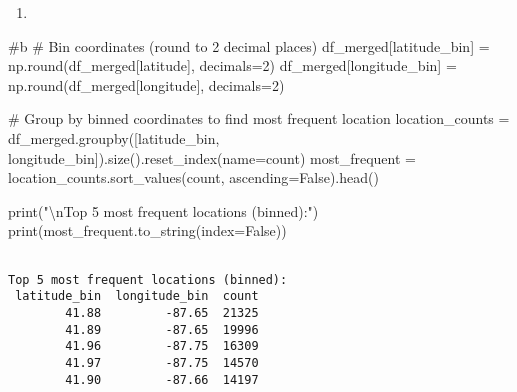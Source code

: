 \documentclass[
  letterpaper,
  DIV=11,
  numbers=noendperiod]{scrartcl}
\newenvironment{Shaded}{\begin{snugshade}}{\end{snugshade}}
\newcommand{\BuiltInTok}[1]{\textcolor[rgb]{0.00,0.23,0.31}{#1}}
\newcommand{\CharTok}[1]{\textcolor[rgb]{0.13,0.47,0.30}{#1}}
\newcommand{\CommentTok}[1]{\textcolor[rgb]{0.37,0.37,0.37}{#1}}
\newcommand{\DecValTok}[1]{\textcolor[rgb]{0.68,0.00,0.00}{#1}}
\newcommand{\NormalTok}[1]{\textcolor[rgb]{0.00,0.23,0.31}{#1}}
\newcommand{\OperatorTok}[1]{\textcolor[rgb]{0.37,0.37,0.37}{#1}}
\newcommand{\StringTok}[1]{\textcolor[rgb]{0.13,0.47,0.30}{#1}}
\newcommand{\VariableTok}[1]{\textcolor[rgb]{0.07,0.07,0.07}{#1}}
\providecommand{\tightlist}{%
  \setlength{\itemsep}{0pt}\setlength{\parskip}{0pt}}\usepackage{longtable,booktabs,array}
\begin{document}
\begin{enumerate}
\def\labelenumi{\alph{enumi}.}
\setcounter{enumi}{1}
\tightlist
\item
\end{enumerate}

\begin{Shaded}
\begin{Highlighting}[]
\CommentTok{\#b}
\CommentTok{\# Bin coordinates (round to 2 decimal places)}
\NormalTok{df\_merged[}\StringTok{\textquotesingle{}latitude\_bin\textquotesingle{}}\NormalTok{] }\OperatorTok{=}\NormalTok{ np.}\BuiltInTok{round}\NormalTok{(df\_merged[}\StringTok{\textquotesingle{}latitude\textquotesingle{}}\NormalTok{], decimals}\OperatorTok{=}\DecValTok{2}\NormalTok{)}
\NormalTok{df\_merged[}\StringTok{\textquotesingle{}longitude\_bin\textquotesingle{}}\NormalTok{] }\OperatorTok{=}\NormalTok{ np.}\BuiltInTok{round}\NormalTok{(df\_merged[}\StringTok{\textquotesingle{}longitude\textquotesingle{}}\NormalTok{], decimals}\OperatorTok{=}\DecValTok{2}\NormalTok{)}

\CommentTok{\# Group by binned coordinates to find most frequent location}
\NormalTok{location\_counts }\OperatorTok{=}\NormalTok{ df\_merged.groupby([}\StringTok{\textquotesingle{}latitude\_bin\textquotesingle{}}\NormalTok{, }\StringTok{\textquotesingle{}longitude\_bin\textquotesingle{}}\NormalTok{]).size().reset\_index(name}\OperatorTok{=}\StringTok{\textquotesingle{}count\textquotesingle{}}\NormalTok{)}
\NormalTok{most\_frequent }\OperatorTok{=}\NormalTok{ location\_counts.sort\_values(}\StringTok{\textquotesingle{}count\textquotesingle{}}\NormalTok{, ascending}\OperatorTok{=}\VariableTok{False}\NormalTok{).head()}

\BuiltInTok{print}\NormalTok{(}\StringTok{"}\CharTok{\textbackslash{}n}\StringTok{Top 5 most frequent locations (binned):"}\NormalTok{)}
\BuiltInTok{print}\NormalTok{(most\_frequent.to\_string(index}\OperatorTok{=}\VariableTok{False}\NormalTok{))}
\end{Highlighting}
\end{Shaded}

\begin{verbatim}

Top 5 most frequent locations (binned):
 latitude_bin  longitude_bin  count
        41.88         -87.65  21325
        41.89         -87.65  19996
        41.96         -87.75  16309
        41.97         -87.75  14570
        41.90         -87.66  14197
\end{verbatim}
\end{document}

